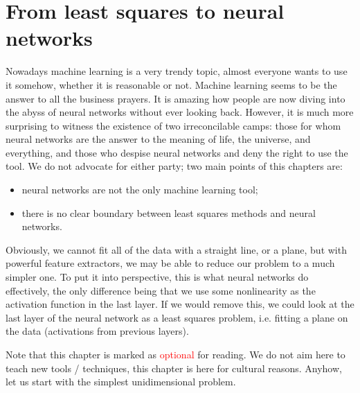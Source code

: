 \documentclass[notitlepage,oneside]{book}
\begin{document}
\chapter{From least squares to neural networks}

Nowadays machine learning is a very trendy topic, almost everyone wants to use it somehow, whether it is reasonable or not.
Machine learning seems to be the answer to all the business prayers.
It is amazing how people are now diving into the abyss of neural networks without ever looking back.
However, it is much more surprising to witness the existence of two irreconcilable camps: those for whom neural networks are the answer
to the meaning of life, the universe, and everything, and those who despise neural networks and deny the right to use the tool.
We do not advocate for either party; two main points of this chapters are:
\begin{itemize}
\item neural networks are not the only machine learning tool;
\item there is no clear boundary between least squares methods and neural networks.
\end{itemize}

Obviously, we cannot fit all of the data with a straight line, or a plane, but with powerful feature extractors, we may be able to reduce our problem to a much simpler one.
To put it into perspective, this is what neural networks do effectively, the only difference being that we use some nonlinearity as the activation function in the last layer.
If we would remove this, we could look at the last layer of the neural network as a least squares problem, i.e. fitting a plane on the data (activations from previous layers).

Note that this chapter is marked as \textcolor{red}{optional} for reading.
We do not aim here to teach new tools / techniques, this chapter is here for cultural reasons.
Anyhow, let us start with the simplest unidimensional problem.
\end{document}
